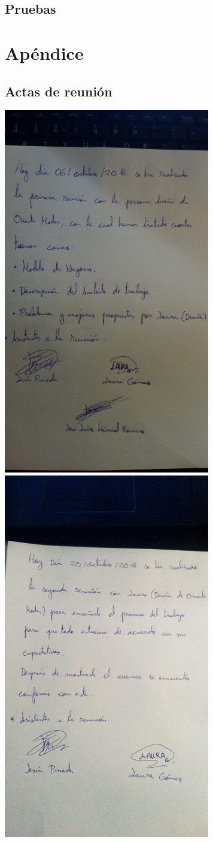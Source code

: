 \subsection{Pruebas}


\section{Apéndice}
\subsection{Actas de reunión}
\includegraphics[height=16cm, center]{images/acta1.jpg} \newpage
\includegraphics[height=16cm, center]{images/acta2.jpg}
